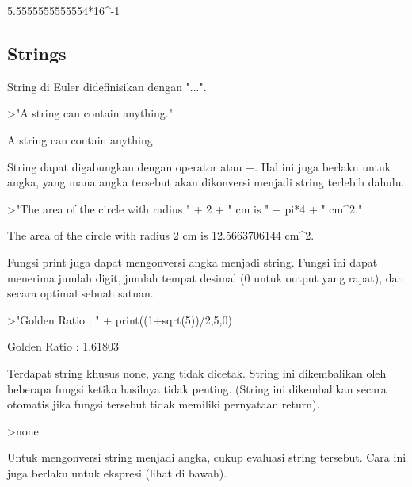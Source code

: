 \documentclass{article}
\newenvironment{eulernotebook}{\par}{\par}
\newcommand{\eulersubheading}[1]{\subsection{#1}}
\newenvironment{eulercomment}{\par\medskip}{\par\medskip}
\begin{document}
\begin{eulernotebook}
\begin{euleroutput}
  5.5555555555554*16^-1
\end{euleroutput}
\eulersubheading{Strings}
\begin{eulercomment}
String di Euler didefinisikan dengan "...".
\end{eulercomment}
\begin{eulerprompt}
>"A string can contain anything."
\end{eulerprompt}
\begin{euleroutput}
  A string can contain anything.
\end{euleroutput}
\begin{eulercomment}
String dapat digabungkan dengan operator \textbar{} atau +. Hal ini juga
berlaku untuk angka, yang mana angka tersebut akan dikonversi menjadi
string terlebih dahulu.
\end{eulercomment}
\begin{eulerprompt}
>"The area of the circle with radius " + 2 + " cm is " + pi*4 + " cm^2."
\end{eulerprompt}
\begin{euleroutput}
  The area of the circle with radius 2 cm is 12.5663706144 cm^2.
\end{euleroutput}
\begin{eulercomment}
Fungsi print juga dapat mengonversi angka menjadi string. Fungsi ini
dapat menerima jumlah digit, jumlah tempat desimal (0 untuk output
yang rapat), dan secara optimal sebuah satuan.
\end{eulercomment}
\begin{eulerprompt}
>"Golden Ratio : " + print((1+sqrt(5))/2,5,0)
\end{eulerprompt}
\begin{euleroutput}
  Golden Ratio : 1.61803
\end{euleroutput}
\begin{eulercomment}
Terdapat string khusus none, yang tidak dicetak. String ini
dikembalikan oleh beberapa fungsi ketika hasilnya tidak penting.
(String ini dikembalikan secara otomatis jika fungsi tersebut tidak
memiliki pernyataan return).
\end{eulercomment}
\begin{eulerprompt}
>none
\end{eulerprompt}
\begin{eulercomment}
Untuk mengonversi string menjadi angka, cukup evaluasi string
tersebut. Cara ini juga berlaku untuk ekspresi (lihat di bawah).
\end{eulercomment}
\begin{eulerprompt}

\end{eulerprompt}
\end{eulernotebook}
\end{document}
